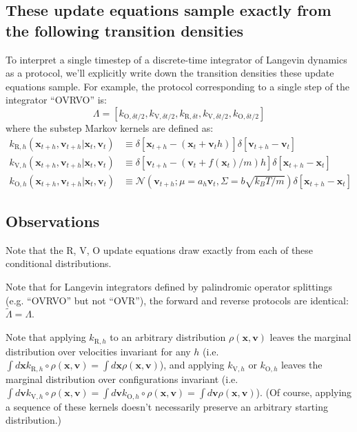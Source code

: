 \documentclass[11pt]{article}
\newcommand{\x}{\mathbf{x}}
\newcommand{\vel}{\mathbf{v}}
\begin{document}
\subsection{These update equations sample exactly from the following transition densities}
To interpret a single timestep of a discrete-time integrator of Langevin dynamics as a protocol, we'll explicitly write down the transition densities these update equations sample.
For example, the protocol corresponding to a single step of the integrator ``OVRVO'' is:
$$\Lambda = [k_{\text{O}, \delta t / 2},
k_{\text{V}, \delta t / 2},
k_{\text{R}, \delta t},
k_{\text{V}, \delta t / 2},
k_{\text{O}, \delta t / 2}]$$
where the substep Markov kernels are defined as:
$$\begin{aligned}
k_{\text{R}, h}(\x_{t+h}, \vel_{t+h} | \x_t, \vel_t) &\equiv  \delta[ \x_{t+h} - (\x_t + \vel_t h)] \delta [\vel_{t+h} - \vel_t]\\
k_{\text{V}, h}(\x_{t+h}, \vel_{t+h} | \x_t, \vel_t) &\equiv  \delta[ \vel_{t+h} - (\vel_t + f(\x_t) / m) h] \delta [\x_{t+h} - \x_t]\\
k_{\text{O}, h}(\x_{t+h}, \vel_{t+h} | \x_t, \vel_t) &\equiv  \mathcal{N}(\vel_{t+h} ; \mu=a_h \vel_t, \Sigma=b \sqrt{k_B T / m}) \delta [\x_{t+h} - \x_t]
\end{aligned} $$

\subsection{Observations}
Note that the R, V, O update equations draw exactly from each of these conditional distributions.

Note that for Langevin integrators defined by palindromic operator splittings (e.g. ``OVRVO'' but not ``OVR''), the forward and reverse protocols are identical: $\tilde{\Lambda} = \Lambda$.

Note that applying $k_{\text{R}, h}$ to an arbitrary distribution $\rho(\x, \vel)$ leaves the marginal distribution over velocities invariant for any $h$ (i.e. $\int d \x k_{\text{R}, h} \circ \rho(\x, \vel) = \int d \x \rho(\x, \vel)$), and applying $k_{\text{V}, h}$ or $k_{\text{O}, h}$ leaves the marginal distribution over configurations invariant (i.e. $\int d \vel k_{\text{V}, h} \circ \rho(\x, \vel) = \int d \vel k_{\text{O}, h} \circ \rho(\x, \vel) = \int d \vel \rho(\x, \vel)$).
(Of course, applying a sequence of these kernels doesn't necessarily preserve an arbitrary starting distribution.)
\end{document}
